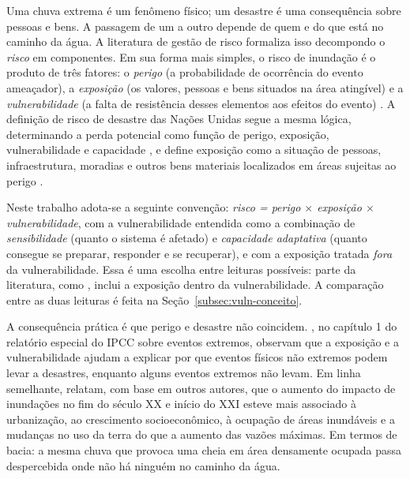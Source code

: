 Uma chuva extrema é um fenômeno físico; um desastre é uma consequência sobre pessoas e bens. A passagem de um a outro depende de quem e do que está no caminho da água. A literatura de gestão de risco formaliza isso decompondo o \emph{risco} em componentes. Em sua forma mais simples, o risco de inundação é o produto de três fatores: o \emph{perigo} (a probabilidade de ocorrência do evento ameaçador), a \emph{exposição} (os valores, pessoas e bens situados na área atingível) e a \emph{vulnerabilidade} (a falta de resistência desses elementos aos efeitos do evento) \cite{kron2005}.  A definição de risco de desastre das Nações Unidas segue a mesma lógica, determinando a perda potencial como função de perigo, exposição, vulnerabilidade e capacidade \cite{undrr2017risk}, e define exposição como a situação de pessoas, infraestrutura, moradias e outros bens materiais localizados em áreas sujeitas ao perigo \cite{undrr2017exposure}.

Neste trabalho adota-se a seguinte convenção: \emph{risco = perigo $\times$ exposição $\times$ vulnerabilidade}, com a vulnerabilidade entendida como a combinação de \emph{sensibilidade} (quanto o sistema é afetado) e \emph{capacidade adaptativa} (quanto consegue se preparar, responder e se recuperar), e com a exposição tratada \emph{fora} da vulnerabilidade. Essa é uma escolha entre leituras possíveis: parte da literatura, como , inclui a exposição dentro da vulnerabilidade. A comparação entre as duas leituras é feita na Seção~\ref{subsec:vuln-conceito}. 

A consequência prática é que perigo e desastre não coincidem. , no capítulo 1 do relatório especial do IPCC sobre eventos extremos, observam que a exposição e a vulnerabilidade ajudam a explicar por que eventos físicos não extremos podem levar a desastres, enquanto alguns eventos extremos não levam.  Em linha semelhante,  relatam, com base em outros autores, que o aumento do impacto de inundações no fim do século XX e início do XXI esteve mais associado à urbanização, ao crescimento socioeconômico, à ocupação de áreas inundáveis e a mudanças no uso da terra do que a aumento das vazões máximas.  Em termos de bacia: a mesma chuva que provoca uma cheia em área densamente ocupada passa despercebida onde não há ninguém no caminho da água.

